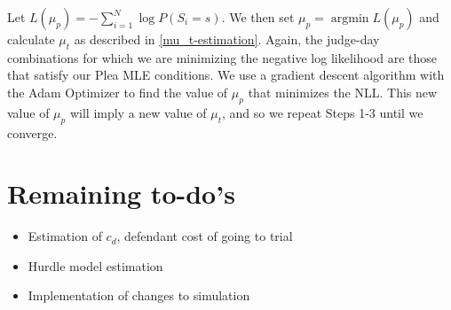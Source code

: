 \documentclass[11pt]{article}
\DeclareMathOperator*{\argmin}{argmin}
\begin{document}
      Let $L(\mu_p) = -\sum_{i=1}^N \log P(S_i = s)$. We then set
			 $\mu_p = \argmin L(\mu_p)$ and calculate $\mu_t$ as described in \ref{mu_t-estimation}. Again, the judge-day combinations for which we are minimizing the negative log likelihood are those that satisfy our Plea MLE conditions. We use a gradient descent algorithm with the Adam Optimizer to find the value of $\mu_p$ that minimizes the NLL. This new value of $\mu_p$ will imply a new value of $\mu_t$, and so we repeat Steps 1-3 until we converge.

\section{Remaining to-do's}
  \begin{itemize}
    \item Estimation of $c_d$, defendant cost of going to trial
    \item Hurdle model estimation
    \item Implementation of changes to simulation
  \end{itemize}
\end{document}
